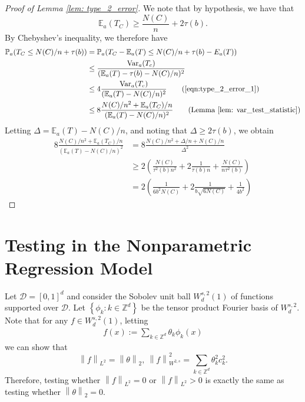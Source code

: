 \documentclass{article}
\newcommand{\norm}[1]{\left\lVert#1\right\rVert}
\newcommand{\set}[1]{\left\{#1\right\}}
\newcommand{\Var}{\mathrm{Var}}
\newcommand{\1}{\mathbb{I}}
\newcommand{\Pbb}{\mathbb{P}}
\newcommand{\Ebb}{\mathbb{E}}
\theoremstyle{alden}
\theoremstyle{aldenthm}
\theoremstyle{definition}
\theoremstyle{remark}
\begin{document}
\begin{proof}[Proof of Lemma \ref{lem: type_2_error}]
	We note that by hypothesis, we have that
	\begin{equation}
	\label{eqn:type_2_error_1}
	\Ebb_a(T_C) \geq \frac{N(C)}{n} + 2\tau(b).
	\end{equation}
	By Chebyshev's inequality, we therefore have
	\begin{align*}
	\Pbb_{a}(T_C \leq N(C)/n + \tau(b)) & = \Pbb_{a}(T_C - \Ebb_a(T) \leq N(C)/n + \tau(b) - E_a(T)) \\
	& \leq \frac{\Var_a(T_c)}{(\Ebb_a(T) - \tau(b) - N(C)/n)^2} \\
	& \leq 4\frac{\Var_a(T_c)}{(\Ebb_a(T) - N(C)/n)^2} \tag{\ref{eqn:type_2_error_1}}\\
	& \leq 8\frac{N(C)/n^2 + \Ebb_a(T_C)/n}{(\Ebb_a(T) - N(C)/n)^2} \tag{Lemma \ref{lem: var_test_statistic}} \\
	\end{align*}
	Letting $\Delta = \Ebb_a(T) - N(C)/n$, and noting that $\Delta \geq 2\tau(b)$, we obtain
	\begin{align*}
	8\frac{N(C)/n^2 + \Ebb_a(T_C)/n}{(\Ebb_a(T) - N(C)/n)^2} & = 8 \frac{N(C)/n^2 + \Delta/n + N(C)/n}{\Delta^2} \\
	& \geq 2 \left(\frac{N(C)}{\tau^2(b)n^2} + 2\frac{1}{\tau(b) n} + \frac{N(C)}{n\tau^2(b)}\right) \\
	& = 2 \left(\frac{1}{6b^2N(C)} + 2\frac{1}{b\sqrt{6N(C)}} +  \frac{1}{4b^2}\right)
	\end{align*}
\end{proof}

\section{Testing in the Nonparametric Regression Model}
Let $\mathcal{D} = [0,1]^d$ and consider the Sobolev unit ball $W^{s,2}_d(1)$ of functions supported over $\mathcal{D}$. Let $\set{\phi_k: k \in \mathbb{Z}^d}$ be the tensor product Fourier basis of $W^{s,2}_d$. Note that for any $f \in W^{s,2}_d(1)$, letting
\begin{align*}
f(x) := \sum_{k \in \mathbb{Z}^d} \theta_k \phi_k(x)
\end{align*}
we can show that
\begin{equation*}
\norm{f}_{L^2} = \norm{\theta}_{2}, ~ \norm{f}_{W^{2,s}}^2 = \sum_{k \in \mathbb{Z}^d} \theta_k^2 c_k^2.
\end{equation*}
Therefore, testing whether $\norm{f}_{L^2} = 0$ or $\norm{f}_{L^2} > 0$ is exactly the same as testing whether $\norm{\theta}_2 = 0$. 
\end{document}
